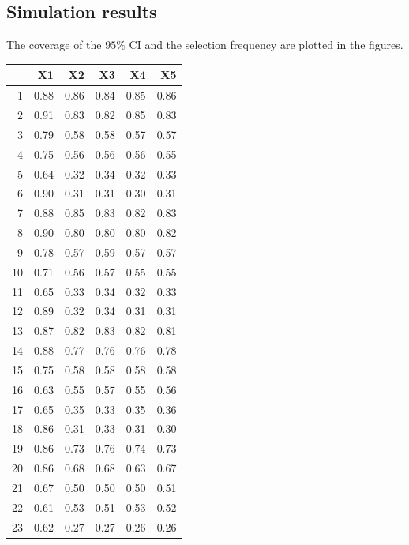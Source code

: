 \documentclass[authoryear, review, 11pt]{elsarticle}
\begin{document}
	\subsection{Simulation results}
	The coverage of the $95\%$ CI and the selection frequency are plotted in the figures.\\
		
\begin{table}[ht]
\begin{center}
\begin{tabular}{rrrrrr}
  \hline
 & X1 & X2 & X3 & X4 & X5 \\ 
  \hline
1 & 0.88 & 0.86 & 0.84 & 0.85 & 0.86 \\ 
  2 & 0.91 & 0.83 & 0.82 & 0.85 & 0.83 \\ 
  3 & 0.79 & 0.58 & 0.58 & 0.57 & 0.57 \\ 
  4 & 0.75 & 0.56 & 0.56 & 0.56 & 0.55 \\ 
  5 & 0.64 & 0.32 & 0.34 & 0.32 & 0.33 \\ 
  6 & 0.90 & 0.31 & 0.31 & 0.30 & 0.31 \\ 
  7 & 0.88 & 0.85 & 0.83 & 0.82 & 0.83 \\ 
  8 & 0.90 & 0.80 & 0.80 & 0.80 & 0.82 \\ 
  9 & 0.78 & 0.57 & 0.59 & 0.57 & 0.57 \\ 
  10 & 0.71 & 0.56 & 0.57 & 0.55 & 0.55 \\ 
  11 & 0.65 & 0.33 & 0.34 & 0.32 & 0.33 \\ 
  12 & 0.89 & 0.32 & 0.34 & 0.31 & 0.31 \\ 
  13 & 0.87 & 0.82 & 0.83 & 0.82 & 0.81 \\ 
  14 & 0.88 & 0.77 & 0.76 & 0.76 & 0.78 \\ 
  15 & 0.75 & 0.58 & 0.58 & 0.58 & 0.58 \\ 
  16 & 0.63 & 0.55 & 0.57 & 0.55 & 0.56 \\ 
  17 & 0.65 & 0.35 & 0.33 & 0.35 & 0.36 \\ 
  18 & 0.86 & 0.31 & 0.33 & 0.31 & 0.30 \\ 
  19 & 0.86 & 0.73 & 0.76 & 0.74 & 0.73 \\ 
  20 & 0.86 & 0.68 & 0.68 & 0.63 & 0.67 \\ 
  21 & 0.67 & 0.50 & 0.50 & 0.50 & 0.51 \\ 
  22 & 0.61 & 0.53 & 0.51 & 0.53 & 0.52 \\ 
  23 & 0.62 & 0.27 & 0.27 & 0.26 & 0.26 \\ 

\end{tabular}
\end{center}
\end{table}
\end{document}
